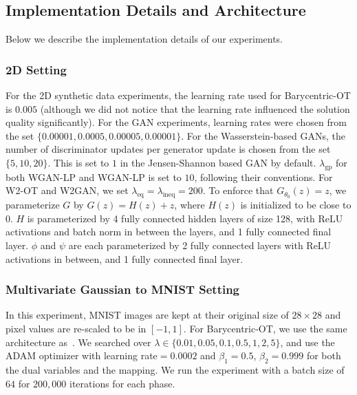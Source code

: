 \documentclass[runningheads]{llncs}
\begin{document}
\subsection{Implementation Details and Architecture}\label{sec:exp_details}

Below we describe the implementation details of our experiments.
\subsubsection{2D Setting}
For the 2D synthetic data experiments, the learning rate used for Barycentric-OT is $0.005$ (although we did not notice that the learning rate influenced the solution quality significantly). For the GAN experiments, learning rates were chosen from the set $\{0.00001, 0.0005, 0.00005, 0.00001\}$. For the Wasserstein-based GANs, the number of discriminator updates per generator update is chosen from the set $\{5, 10, 20\}$. This is set to $1$ in the Jensen-Shannon based GAN by default. $\lambda_{\text{gp}}$ for both WGAN-LP and WGAN-LP is set to $10$, following their conventions. For W2-OT and W2GAN, we set $\lambda_{\text{eq}} = \lambda_{\text{ineq}} = 200$.%
To enforce that $G_{\theta_0}(z) = z$, we parameterize $G$ by $G(z) = H(z) + z$, where $H(z)$ is initialized to be close to $0$. $H$ is parameterized by 4 fully connected hidden layers of size 128, with ReLU activations and batch norm in between the layers, and 1 fully connected final layer. $\phi$ and $\psi$ are each parameterized by 2 fully connected layers with ReLU activations in between, and 1 fully connected final layer.

\subsubsection{Multivariate Gaussian to MNIST Setting}
In this experiment, MNIST images are kept at their original size of $28 \times 28$ and pixel values are re-scaled to be in $[-1, 1]$.
For Barycentric-OT, we use the same architecture as~\citep{Seguy2018LSOT}. We searched over $\lambda \in \{0.01, 0.05, 0.1, 0.5, 1, 2, 5\}$, and use the ADAM optimizer with learning rate$ = 0.0002$ and $\beta_1 = 0.5$, $\beta_2 = 0.999$ for both the dual variables and the mapping. We run the experiment with a batch size of $64$ for $200,000$ iterations for each phase.
\end{document}
